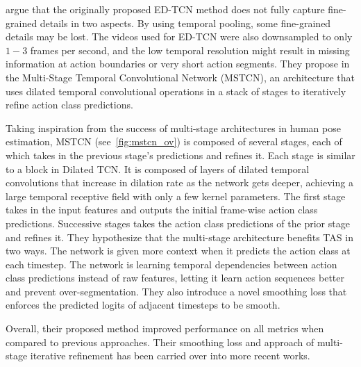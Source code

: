 

\citeauthor{farha2019ms} argue that the originally proposed ED-TCN method does not fully capture fine-grained details in two aspects. By using temporal pooling, some fine-grained details may be lost. The videos used for ED-TCN were also downsampled to only $1 - 3$ frames per second, and the low temporal resolution might result in missing information at action boundaries or very short action segments. They propose in \cite{farha2019ms} the Multi-Stage Temporal Convolutional Network (MSTCN), an architecture that uses dilated temporal convolutional operations in a stack of stages to iteratively refine action class predictions.

Taking inspiration from the success of multi-stage architectures in human pose estimation, MSTCN (see~\cref{fig:mstcn_ov}) is composed of several stages, each of which takes in the previous stage's predictions and refines it. Each stage is similar to a block in Dilated TCN. It is composed of layers of dilated temporal convolutions that increase in dilation rate as the network gets deeper, achieving a large temporal receptive field with only a few kernel parameters. The first stage takes in the input features and outputs the initial frame-wise action class predictions. Successive stages takes the action class predictions of the prior stage and refines it. They hypothesize that the multi-stage architecture benefits TAS in two ways. The network is given more context when it predicts the action class at each timestep. The network is learning temporal dependencies between action class predictions instead of raw features, letting it learn action sequences better and prevent over-segmentation. 
They also introduce a novel smoothing loss that enforces the predicted logits of adjacent timesteps to be smooth. %

Overall, their proposed method improved performance on all metrics when compared to previous approaches. Their smoothing loss and approach of multi-stage iterative refinement has been carried over into more recent works.


